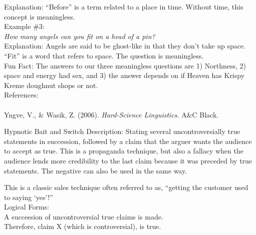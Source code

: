 \documentclass[a4paper,12pt,single,pdftex]{scrartcl}
\begin{document}
    
      Explanation: “Before” is a term related to a place in time. Without time, this concept is meaningless.
    \\

    
      Example \#3:
    \\

    
      {\em How many angels can you fit on a head of a pin?}
    \\

    
      Explanation: Angels are said to be ghost-like in that they don’t take up space. “Fit” is a word that refers to space. The question is meaningless.
    \\

    
      Fun Fact: The answers to our three meaningless questions are 1) Northness, 2) space and energy had sex, and 3) the answer depends on if Heaven has Krispy Kreme doughnut shops or not.
    \\

    
      References:
    \\

    
      
        
      \\

      
        
          Yngve, V., \& Wasik, Z. (2006). {\it Hard-Science Linguistics}. A\&C Black.
        
      
    
  

Hypnotic Bait and Switch
    Description: Stating several uncontroversially true statements in succession, followed by a claim that the arguer wants the audience to accept as true.  This is a propaganda technique, but also a fallacy when the audience lends more credibility to the last claim because it was preceded by true statements.  The negative can also be used in the same way.

    
      This is a classic sales technique often referred to as, “getting the customer used to saying ‘yes’!”
    \\

    
      Logical Forms:
    \\

    
      A succession of uncontroversial true claims is made.
    \\

    
      Therefore, claim X (which is controversial), is true.
    \\

    
       
\end{document}
